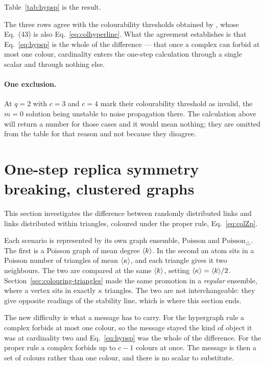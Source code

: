 Table~\ref{tab:hypsp} is the result.

The three rows agree with the colourability thresholds obtained by
\citet{gabrie2017}, whose Eq.~(43) is also
Eq.~\eqref{eq:colhyperline}. What the agreement
establishes is that Eq.~\eqref{eq:hypsp} is the
whole of the difference --- that once a complex can forbid at most one colour,
cardinality enters the one-step calculation through a single scalar and through
nothing else.

\paragraph{One exclusion.} At $q=2$ with $c=3$ and $c=4$
\citet{gabrie2017} mark their colourability threshold as invalid, the $m=0$
solution being unstable to noise propagation there. The calculation above will
return a number for those cases and it would mean nothing; they are omitted from
the table for that reason and not because they disagree.

\section{One-step replica symmetry breaking, clustered graphs}
\label{sec:colouring-cq}

This section investigates the difference between randomly distributed links and
links distributed within triangles, coloured under the proper rule,
Eq.~\eqref{eq:colZp}.

Each scenario is represented by its own graph ensemble, $\mathrm{Poisson}$ and
$\mathrm{Poisson}_{\triangle}$. The first is a Poisson graph of mean degree
$\langle k \rangle$. In the second an atom sits in a Poisson number of triangles of mean
$\langle \kappa \rangle$, and each triangle gives it two neighbours. The two are compared
at the same $\langle k \rangle$, setting $\langle \kappa \rangle=\langle k \rangle/2$.
Section~\ref{sec:colouring-triangles} made the same promotion in a
\emph{regular} ensemble, where a vertex sits in exactly $\kappa$ triangles. The
two are not interchangeable: they give opposite readings of the stability line,
which is where this section ends.

The new difficulty is what a message has to carry. For the hypergraph rule a
complex forbids at most one colour, so the message stayed the kind of object it
was at cardinality two and Eq.~\eqref{eq:hypsp} was the whole of the
difference. For the proper rule a complex forbids up to $c-1$ colours at once.
The message is then a set of colours rather than one colour, and there is no
scalar to substitute.

